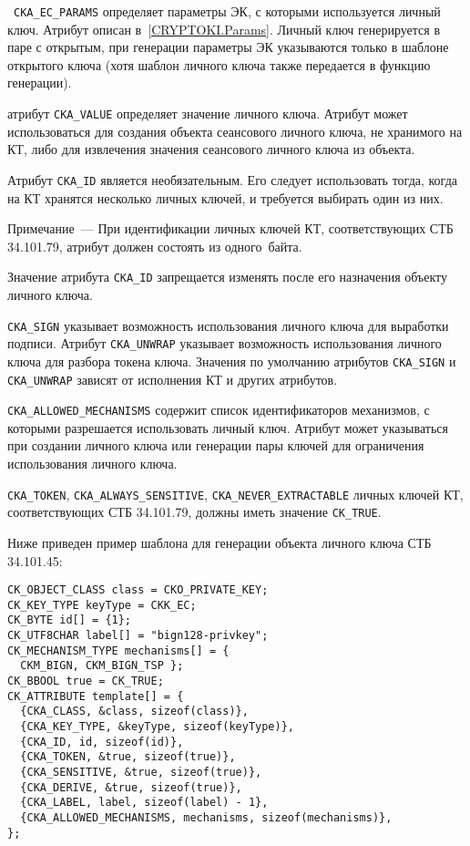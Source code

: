 ~\verb|CKA_EC_PARAMS| определяет параметры 
ЭК, с которыми используется личный ключ. Атрибут описан 
в~\ref{CRYPTOKI.Params}.  
%
Личный ключ генерируется в паре с открытым,
при генерации параметры ЭК указываются только в шаблоне
открытого ключа (хотя шаблон личного ключа также передается в 
функцию генерации).

 атрибут \verb|CKA_VALUE| определяет значение 
личного ключа. Атрибут может использоваться для
создания объекта сеансового личного ключа, не хранимого на КТ, либо для 
извлечения значения сеансового личного ключа из объекта. 

Атрибут \verb|CKA_ID| является необязательным. 
Его следует использовать тогда, когда на КТ хранятся 
несколько личных ключей, и требуется выбирать один из них.

\begin{note}
Примечание~---
При идентификации личных ключей КТ, соответствующих СТБ 34.101.79,
атрибут должен состоять из одного~байта.
\end{note}

Значение атрибута \verb|CKA_ID| запрещается изменять
после его назначения объекту личного ключа.

 \verb|CKA_SIGN| указывает возможность
использования личного ключа для выработки подписи.
Атрибут \verb|CKA_UNWRAP| указывает возможность
использования личного ключа для разбора токена ключа.
Значения по умолчанию атрибутов \verb|CKA_SIGN| и \verb|CKA_UNWRAP|
зависят от исполнения КТ и других атрибутов.

 \verb|CKA_ALLOWED_MECHANISMS| содержит список
идентификаторов механизмов, с которыми разрешается использовать
личный ключ. Атрибут может указываться при создании личного
ключа или генерации пары ключей для ограничения использования
личного ключа.

 \verb|CKA_TOKEN|, \verb|CKA_ALWAYS_SENSITIVE|, 
\verb|CKA_NEVER_EXTRACTABLE| 
личных ключей КТ, соответствующих СТБ 34.101.79,
должны иметь значение \verb|CK_TRUE|.

Ниже приведен пример шаблона для генерации объекта личного ключа СТБ 34.101.45:
\begin{verbatim}
CK_OBJECT_CLASS class = CKO_PRIVATE_KEY;
CK_KEY_TYPE keyType = CKK_EC;
CK_BYTE id[] = {1};
CK_UTF8CHAR label[] = "bign128-privkey";
CK_MECHANISM_TYPE mechanisms[] = {
  CKM_BIGN, CKM_BIGN_TSP };
CK_BBOOL true = CK_TRUE;
CK_ATTRIBUTE template[] = {
  {CKA_CLASS, &class, sizeof(class)},
  {CKA_KEY_TYPE, &keyType, sizeof(keyType)},
  {CKA_ID, id, sizeof(id)},
  {CKA_TOKEN, &true, sizeof(true)},
  {CKA_SENSITIVE, &true, sizeof(true)},
  {CKA_DERIVE, &true, sizeof(true)},
  {CKA_LABEL, label, sizeof(label) - 1},
  {CKA_ALLOWED_MECHANISMS, mechanisms, sizeof(mechanisms)},
};
\end{verbatim}

